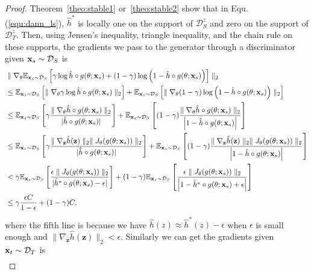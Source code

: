 \documentclass{article} \usepackage{iclr2023_conference,times}
\newcommand{\E}{\mathbb{E}}
\newcommand{\myref}[1]{Equ. (\ref{#1})}
\newcommand{\z}{\mathbf{z}}
\newcommand{\D}{\mathcal{D}}
\begin{document}
\begin{proof}
Theorem~\ref{theo:stable1} or~\ref{theo:stable2} show that in \myref{equ:dann_ls}, $\hat{h}^*$ is locally one on the support of $\D^z_S$ and zero on the support of $\D^z_T$. Then, using Jensen’s inequality, triangle inequality, and the chain rule on these supports, the gradients we pass to the generator through a discriminator given $\x_s\sim \D_S$ is
\begin{equation}
\begin{aligned}
 &\parallel\nabla_\theta\E_{\x_s\sim \D_S}\left[\gamma\log \hat{h}\circ g(\theta;\x_s)+(1-\gamma)\log\left(1-\hat{h}\circ g(\theta;\x_s)\right) \right] \parallel_2\\
 &\leq \E_{\x_s\sim \D_S}\left[\parallel\nabla_\theta\gamma\log \hat{h}\circ g(\theta;\x_s)\parallel_2\right]+\E_{\x_s\sim \D_S}\left[\parallel\nabla_\theta(1-\gamma)\log\left(1-\hat{h}\circ g(\theta;\x_s)\right)\parallel_2 \right] \\
 &\leq  \E_{\x_s\sim \D_S}\left[\gamma\frac{\parallel\nabla_\theta\hat{h}\circ g(\theta;\x_s)\parallel_2}{|\hat{h}\circ g(\theta;\x_s)| }\right]
 +\E_{\x_s\sim \D_S}\left[(1-\gamma)\frac{\parallel\nabla_\theta\hat{h}\circ g(\theta;\x_s)\parallel_2}{\left|1-\hat{h}\circ g(\theta;\x_s)\right| } \right]\\
 &\leq  \E_{\x_s\sim \D_S}\left[\gamma\frac{\parallel\nabla_\z\hat{h}(\z)\parallel_2\parallel J_\theta(g(\theta;\x_s))\parallel_2}{|\hat{h}\circ g(\theta;\x_s)| }\right]
 +\E_{\x_s\sim \D_S}\left[(1-\gamma)\frac{\parallel\nabla_\z\hat{h}(\z)\parallel_2\parallel J_\theta(g(\theta;\x_s))\parallel_2}{\left|1-\hat{h}\circ g(\theta;\x_s)\right| } \right]\\
 &<  \gamma\E_{\x_s\sim \D_S}\left[\frac{\epsilon \parallel J_\theta(g(\theta;\x_s))\parallel_2}{|\hat{h}^*\circ g(\theta;\x_s)-\epsilon| }\right]
 +(1-\gamma)\E_{\x_s\sim \D_S}\left[\frac{\epsilon \parallel J_\theta(g(\theta;\x_s))\parallel_2}{\left|1-\hat{h}^*\circ g(\theta;\x_s)+\epsilon\right| } \right]\\
 &\leq \gamma\frac{\epsilon C }{1-\epsilon }+(1-\gamma)C,
\end{aligned}\end{equation}
where the fifth line is because we have $\hat{h}(z)\approx\hat{h}^*(z)-\epsilon$ when $\epsilon$ is small enough and $\parallel\nabla_\z\hat{h}(\z)\parallel_2<\epsilon$. Similarly we can get the gradients given $\x_t\sim \D_T$ is
\begin{equation}
\begin{aligned}

\end{aligned}
\end{equation}
\end{proof}
\end{document}
